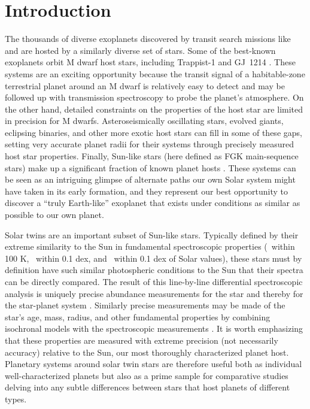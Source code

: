 \documentclass[modern]{aastex62}
\begin{document}
\section{Introduction}
\label{s:intro}

The thousands of diverse exoplanets discovered by transit search missions like \TESS and \kepler are hosted by a similarly diverse set of stars. 
Some of the best-known exoplanets orbit M dwarf host stars, including Trappist-1 \citep{} and GJ~1214 \citep{}. 
These systems are an exciting opportunity because the transit signal of a habitable-zone terrestrial planet around an M dwarf is relatively easy to detect and may be followed up with transmission spectroscopy to probe the planet's atmosphere. 
On the other hand, detailed constraints on the properties of the host star are limited in precision for M dwarfs. 
Asteroseismically oscillating stars, evolved giants, eclipsing binaries, and other more exotic host stars can fill in some of these gaps, setting very accurate planet radii for their systems through precisely measured host star properties. 
Finally, Sun-like stars (here defined as FGK main-sequence stars) make up a significant fraction of known planet hosts . 
These systems can be seen as an intriguing glimpse of alternate paths our own Solar system might have taken in its early formation, and they represent our best opportunity to discover a ``truly Earth-like'' exoplanet that exists under conditions as similar as possible to our own planet.

Solar twins are an important subset of Sun-like stars. 
Typically defined by their extreme similarity to the Sun in fundamental spectroscopic properties (\teff\ within 100 K, \logg\ within 0.1 dex, and \feh\ within 0.1 dex of Solar values), these stars must by definition have such similar photospheric conditions to the Sun that their spectra can be directly compared. 
The result of this line-by-line differential spectroscopic analysis is uniquely precise abundance measurements for the star and thereby for the star-planet system \citep[see e.g.][who achieve 0.01 dex or 2\% precision on abundance measurements for over 30 elements]{Bedell18, Spina18}. 
Similarly precise measurements may be made of the star's age, mass, radius, and other fundamental properties by combining isochronal models with the spectroscopic measurements \citep{}. 
It is worth emphasizing that these properties are measured with extreme precision (not necessarily accuracy) relative to the Sun, our most thoroughly characterized planet host. 
Planetary systems around solar twin stars are therefore useful both as individual well-characterized planets but also as a prime sample for comparative studies delving into any subtle differences between stars that host planets of different types.
\end{document}
